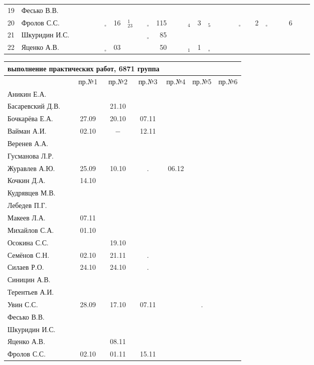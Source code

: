 \documentclass[a4paper,landscape,11pt]{article}
\newcommand*\OK{&\small \ding{51}$\!\!_\circ$} %
\newcommand*\Ok{&\small \ding{51}$\!\!_\circ$} %
\newcommand*\ok{&{\small \ding{51}}} %
\newcommand*\no{&{\small }} %
\newcommand*\da{&{\small\ding{48}$\!\!_1$}} %
\newcommand*\ac{&{\small\ding{48}$\!\!^1_{23}$}} %
\newcommand*\dd{&{\small\ding{48}$\!\!_4$}} %
\newcommand*\de{&{\small\ding{48}$\!\!_5$}} %
\begin{document}
\begin{tabular}{l|l|cccccccccrccccccccccccccccc}
19&Фесько В.В.     \no\no\no\no\no\no\no\no\no \no\no\no\no \no\no\no\no\no\no\no\no\no\no\no\no\no\\
20&Фролов С.С.     \ok\ok\ok\ok\OK&16\ac\ok\OK&115\ok\ok\dd&  3\de\ok\ok\ok\Ok\no& 2\Ok\ok\ok& 6\ok\\ 
21&Шкуридин И.С.   \ok\ok\ok\ok\ok\no\ok\ok\OK& 85\ok\ok\no \no\ok\no\no\no\no\ok\no\no\no\no\no\no\\
22&Яценко А.В.     \ok\ok\ok\ok\OK&03\ok\ok\ok& 50\ok\ok\da&  1\Ok\no\no\no\no\ok\no\no\no\no\no\no\\ 
\bottomrule
\end{tabular} 
\newpage

\begin{tabular}{l|cccccc}
\multicolumn{4}{c}{выполнение практических работ, 6871 группа} \\
\toprule
                &пр.№1&пр.№2&пр.№3&пр.№4&пр.№5&  пр.№6\\
\midrule
Аникин Е.А.     &     &     &     &     &     &\\    
Басаревский Д.В.&     &21.10&     &     &     &\\
Бочкарёва Е.А.  &27.09&20.10&07.11&     &     &\\
Вайман А.И.     &02.10&$-$  &12.11&     &     &\\
Веренев А.А.    &     &     &     &     &     &\\
Гусманова Л.Р.  &     &     &     &     &     &\\
Журавлев А.Ю.   &25.09&10.10&  .  &06.12&     &\\
Кочкин Д.А.     &14.10&     &     &     &     &\\
Кудрявцев М.В.  &     &     &     &     &     &\\
Лебедев П.Г.    &     &     &     &     &     &\\
Макеев Л.А.     &07.11&     &     &     &     &\\
Михайлов С.А.   &01.10&     &     &     &     &\\
Осокина С.С.    &     &19.10&     &     &     &\\
Семёнов С.Н.    &02.10&21.11&  .  &     &     &\\
Силаев Р.О.     &24.10&24.10&  .  &     &     &\\
Синицин А.В.    &     &     &     &     &     &\\
Терентьев А.И.  &     &     &     &     &     &\\
Увин С.С.       &28.09&17.10&07.11&     &  .  &\\
Фесько В.В.     &     &     &     &     &     &\\
Шкуридин И.С.   &     &     &     &     &     &\\
Яценко А.В.     &     &08.11&     &     &     &\\
Фролов С.С.     &02.10&01.11&15.11&     &     &\\
\bottomrule
\end{tabular}
\end{document}
